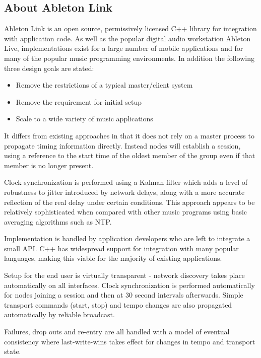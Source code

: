 \documentclass[11pt]{article} %
\theoremstyle{plain}
\theoremstyle{definition}
\begin{document}
\subsection{About Ableton Link}

Ableton Link is an open source, permissively licensed C++ library for
integration with application code. As well as the popular digital audio
workstation Ableton Live, implementations exist for a large number of mobile
applications and for many of the popular music programming environments. In
addition the following three design goals are stated\cite{goltz2018ableton}:

\begin{itemize}
  \item Remove the restrictions of a typical master/client system
  \item Remove the requirement for initial setup
  \item Scale to a wide variety of music applications
\end{itemize}

It differs from existing approaches in that it does not rely on a master
process to propagate timing information directly. Instead nodes will establish
a session, using a reference to the start time of the oldest member of the
group even if that member is no longer present.

Clock synchronization is performed using a Kalman filter which adds a level of
robustness to jitter introduced by network delays, along with a more accurate
reflection of the real delay under certain conditions. This approach appears to
be relatively sophisticated when compared with other music programs using basic
averaging algorithms such as NTP\cite{bletsas2005evaluation}.

Implementation is handled by application developers who are left to integrate a
small API. C++ has widespread support for integration with many popular
languages, making this viable for the majority of existing applications.

Setup for the end user is virtually transparent - network discovery takes place
automatically on all interfaces. Clock synchronization is performed
automatically for nodes joining a session and then at 30 second intervals
afterwards. Simple transport commands (start, stop) and tempo changes are also
propagated automatically by reliable broadcast.

Failures, drop outs and re-entry are all handled with a model of eventual
consistency where last-write-wins takes effect for changes in tempo and
transport state.
\end{document}
